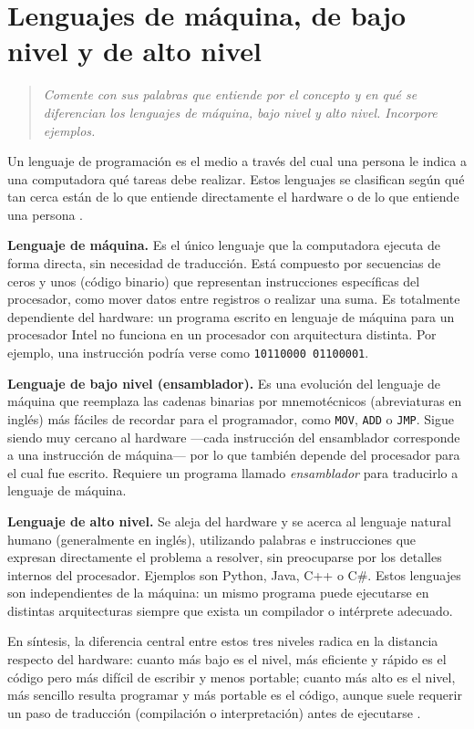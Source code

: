 \documentclass[12pt]{article}
\newcommand{\enunciado}[1]{%
    \begin{quote}
        \itshape #1
    \end{quote}
}
\begin{document}

\newpage
\section{Lenguajes de máquina, de bajo nivel y de alto nivel}

\enunciado{Comente con sus palabras que entiende por el concepto y en qué se diferencian los lenguajes de máquina, bajo nivel y alto nivel. Incorpore ejemplos.}

Un lenguaje de programación es el medio a través del cual una persona le indica a una computadora qué tareas debe realizar. Estos lenguajes se clasifican según qué tan cerca están de lo que entiende directamente el hardware o de lo que entiende una persona \parencite{joyanes2008fundamentos}.

\textbf{Lenguaje de máquina.} Es el único lenguaje que la computadora ejecuta de forma directa, sin necesidad de traducción. Está compuesto por secuencias de ceros y unos (código binario) que representan instrucciones específicas del procesador, como mover datos entre registros o realizar una suma. Es totalmente dependiente del hardware: un programa escrito en lenguaje de máquina para un procesador Intel no funciona en un procesador con arquitectura distinta. Por ejemplo, una instrucción podría verse como \texttt{10110000 01100001}.

\textbf{Lenguaje de bajo nivel (ensamblador).} Es una evolución del lenguaje de máquina que reemplaza las cadenas binarias por mnemotécnicos (abreviaturas en inglés) más fáciles de recordar para el programador, como \texttt{MOV}, \texttt{ADD} o \texttt{JMP}. Sigue siendo muy cercano al hardware —cada instrucción del ensamblador corresponde a una instrucción de máquina— por lo que también depende del procesador para el cual fue escrito. Requiere un programa llamado \emph{ensamblador} para traducirlo a lenguaje de máquina.

\textbf{Lenguaje de alto nivel.} Se aleja del hardware y se acerca al lenguaje natural humano (generalmente en inglés), utilizando palabras e instrucciones que expresan directamente el problema a resolver, sin preocuparse por los detalles internos del procesador. Ejemplos son Python, Java, C++ o C\#. Estos lenguajes son independientes de la máquina: un mismo programa puede ejecutarse en distintas arquitecturas siempre que exista un compilador o intérprete adecuado.

En síntesis, la diferencia central entre estos tres niveles radica en la distancia respecto del hardware: cuanto más bajo es el nivel, más eficiente y rápido es el código pero más difícil de escribir y menos portable; cuanto más alto es el nivel, más sencillo resulta programar y más portable es el código, aunque suele requerir un paso de traducción (compilación o interpretación) antes de ejecutarse \parencite{cairo2005metodologia}.
\end{document}
